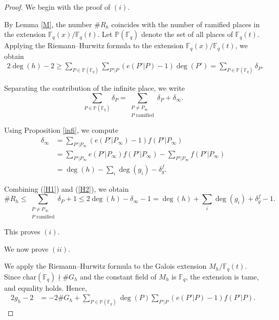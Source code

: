 \documentclass[10pt,a4paper]{amsart}
\begin{document}
\begin{proof}
We begin with the proof of $(i)$.

\medskip

By Lemma \ref{M}, the number $\#R_{h}$ coincides with the number of ramified places in the extension $\mathbb{F}_q(x)/\mathbb{F}_q(t)$. Let $\mathbb{P}(\mathbb{F}_{q})$ denote the set of all places of $\mathbb{F}_{q}(t)$. Applying the Riemann--Hurwitz formula to the extension $\mathbb{F}_q(x)/\mathbb{F}_q(t)$, we obtain
\begin{equation}\label{H1}
\begin{aligned}
2\deg(h)-2
\ge
\sum_{P\in \mathbb{P}(\mathbb{F}_{q}) }\sum_{P'|P}(e(P'|P)-1)\deg(P')
=
\sum_{P\in \mathbb{P}(\mathbb{F}_{q}) }\delta_{P}.
\end{aligned}
\end{equation}

Separating the contribution of the infinite place, we write
\[
\sum_{P\in \mathbb{P}(\mathbb{F}_{q}) }\delta_{P}
=
\sum_{\substack{P\ne P_{\infty} \\ \text{$P$ ramified}}} \delta_{P}
+
\delta_{\infty}.
\]

Using Proposition \ref{infi}, we compute
\begin{equation}\label{H2}
\begin{aligned}
\delta_{\infty}
&=
\sum_{P'|P_{\infty}}(e(P'|P_{\infty})-1)f(P'|P_{\infty}) \\
&=
\sum_{P'|P_{\infty}}e(P'|P_{\infty})f(P'|P_{\infty})
-
\sum_{P'|P_{\infty}}f(P'|P_{\infty}) \\
&=
\deg(h)-\sum_{i}\deg(g_{i})-\delta_{g}^{f}.
\end{aligned}
\end{equation}

Combining (\ref{H1}) and (\ref{H2}), we obtain
\[
\#R_{h}
\le
\sum_{\substack{P\ne P_{\infty} \\ \text{$P$ ramified}}} \delta_{P}+1
\le
2\deg(h)-\delta_{\infty}-1
=
\deg(h)+\sum_{i}\deg(g_{i})+\delta_{g}^{f}-1.
\]

This proves $(i)$.

\medskip

We now prove $(ii)$.

\medskip

We apply the Riemann--Hurwitz formula to the Galois extension $M_{h}/\mathbb{F}_q(t)$. Since $\text{char}(\mathbb{F}_{q})\nmid \#G_{h}$ and the constant field of $M_{h}$ is $\mathbb{F}_{q}$, the extension is tame, and equality holds. Hence,
\begin{equation}\label{ii1}
\begin{aligned}
2g_{h}-2
&=
-2\#G_{h}
+
\sum_{P\in \mathbb{P}(\mathbb{F}_{q}) }\deg(P)\sum_{P'|P}(e(P'|P)-1)f(P'|P).
\end{aligned}
\end{equation}


\end{proof}
\end{document}
